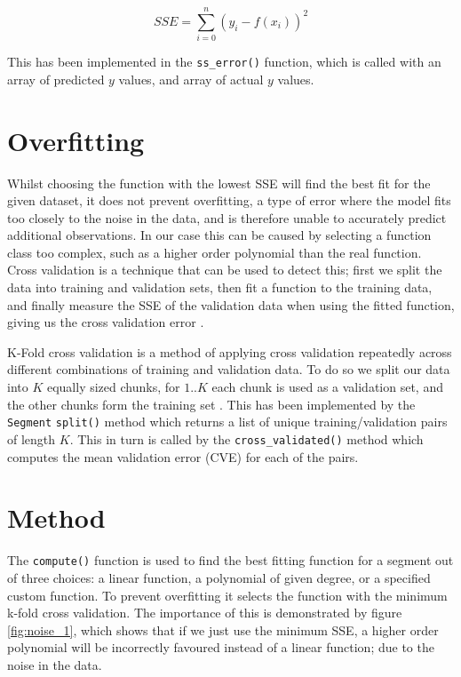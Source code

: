 \documentclass[11pt,a4paper]{scrartcl}
\begin{document}
\[SSE = \sum_{i=0}^{n} ( y_{i} - f(x_{i}) )^{2}\]

This has been implemented in the \lstinline|ss_error()| function, which is called with an array of predicted $y$ values, and array of actual $y$ values.

\section{Overfitting}

Whilst choosing the function with the lowest SSE will find the best fit for the given dataset, it does not prevent overfitting, a type of error where the model fits too closely to the noise in the data, and is therefore unable to accurately predict additional observations. In our case this can be caused by selecting a function class too complex, such as a higher order polynomial than the real function. Cross validation is a technique that can be used to detect this; first we split the data into training and validation sets, then fit a function to the training data, and finally measure the SSE of the validation data when using the fitted function, giving us the cross validation error \cite{lecture_overfitting}.

K-Fold cross validation is a method of applying cross validation repeatedly across different combinations of training and validation data. To do so we split our data into $K$ equally sized chunks, for $1..K$ each chunk is used as a validation set, and the other chunks form the training set \cite{k_fold_validation}. This has been implemented by the \lstinline|Segment| \lstinline|split()| method which returns a list of unique training/validation pairs of length $K$. This in turn is called by the \lstinline|cross_validated()| method which computes the mean validation error (CVE) for each of the pairs.

\section{Method}

The \lstinline|compute()| function is used to find the best fitting function for a segment out of three choices: a linear function, a polynomial of given degree, or a specified custom function. To prevent overfitting it selects the function with the minimum k-fold cross validation. The importance of this is demonstrated by figure \ref{fig:noise_1}, which shows that if we just use the minimum SSE, a higher order polynomial will be incorrectly favoured instead of a linear function; due to the noise in the data.
\end{document}
